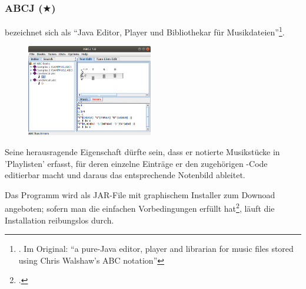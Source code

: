 %
%
%



\subsubsection{ABCJ ($\bigstar$)}

\label{ABCJ} bezeichnet sich als \enquote{Java Editor, Player und
Bibliothekar für Musikdateien}\footnote{\cite[vgl.][\nopage wp.]{Spencer2019a}.
Im Original: \enquote{a pure-Java editor, player and librarian for music files
stored using Chris Walshaw's ABC notation}}.
\begin{figure}
\includegraphics[width=5.5cm]{frontends/abcj/abcj-cadenca1-300dpi.png}
\end{figure}
Seine herausragende Eigenschaft dürfte sein, dass er  notierte
Musikstücke in 'Playlisten' erfasst, für deren einzelne Einträge er den
zugehörigen -Code editierbar macht und daraus  das
entsprechende Notenbild ableitet.

Das Programm wird als JAR-File mit graphischem Installer zum Downoad angeboten;
sofern man die einfachen Vorbedingungen erfüllt hat\footcite[vgl.][\nopage
wp]{Spencer2019a}, läuft die Installation reibungslos durch.

